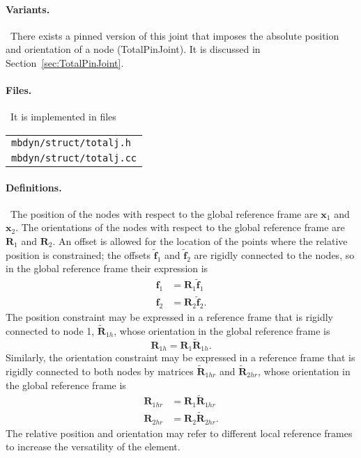 \documentclass[10pt,dvips,fleqn,subeqn]{report}
\newcommand{\T}[1]{\boldsymbol{#1}}
\begin{document}
\paragraph{Variants.} \
There exists a pinned version of this joint that imposes 
the absolute position and orientation of a node (TotalPinJoint).
It is discussed in Section~\ref{sec:TotalPinJoint}.

\paragraph{Files.} \
It is implemented in files\\
\begin{tabular}{l}
\texttt{mbdyn/struct/totalj.h} \\
\texttt{mbdyn/struct/totalj.cc}
\end{tabular}

\paragraph{Definitions.} \
The position of the nodes with respect to the global reference frame
are $\T{x}_1$ and $\T{x}_2$.
The orientations of the nodes with respect to the global reference frame
are $\T{R}_1$ and $\T{R}_2$.
An offset is allowed for the location of the points where 
the relative position is constrained; the offsets $\tilde{\T{f}}_1$
and $\tilde{\T{f}}_2$ are rigidly connected to the nodes,
so in the global reference frame their expression is
\begin{align}
	\T{f}_1 &= \T{R}_1 \tilde{\T{f}}_1 \\
	\T{f}_2 &= \T{R}_2 \tilde{\T{f}}_2 .
\end{align}
The position constraint may be expressed in a reference frame 
that is rigidly connected to node 1, $\tilde{\T{R}}_{1h}$, whose orientation
in the global reference frame is
\begin{equation}
	\T{R}_{1h} = \T{R}_1 \tilde{\T{R}}_{1h} .
\end{equation}
Similarly, the orientation constraint may be expressed in a reference
frame that is rigidly connected to both nodes by matrices
$\tilde{\T{R}}_{1hr}$ and $\tilde{\T{R}}_{2hr}$, whose orientation
in the global reference frame is
\begin{align}
	\T{R}_{1hr} &= \T{R}_1 \tilde{\T{R}}_{1hr} \\
	\T{R}_{2hr} &= \T{R}_2 \tilde{\T{R}}_{2hr} .
\end{align}
The relative position and orientation may refer to different
local reference frames to increase the versatility of the element.
\end{document}
